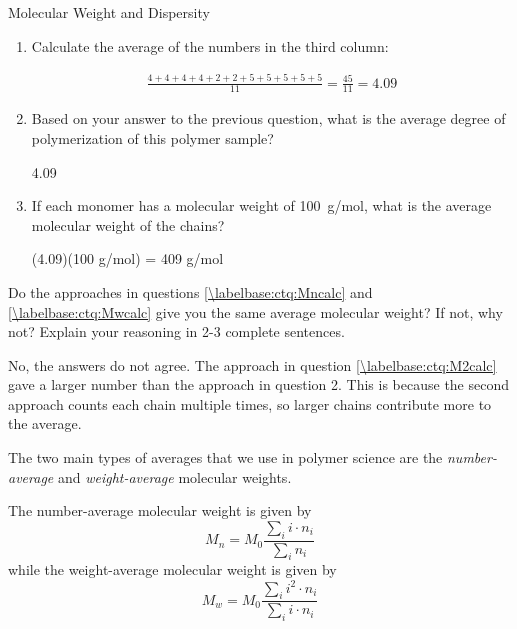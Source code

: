 \begin{activity}{Molecular Weight and Dispersity}
\begin{ctqs}
\begin{enumerate}
			\item Calculate the average of the numbers in the third column:
			
				\begin{solution}[1.5in]
				
					\begin{align*}
						\frac{4+4+4+4+2+2+5+5+5+5+5}{11} = \frac{45}{11} = 4.09
					\end{align*}
				
				\end{solution}
			
			\item Based on your answer to the previous question, what is the average degree of polymerization of this polymer sample?
			
				\begin{solution}[0.75in]
					4.09
				\end{solution}
				
			\item If each monomer has a molecular weight of 100~g/mol, what is the average molecular weight of the chains?
			
				\begin{solution}[0.75in]
					(4.09)(100 g/mol) = 409 g/mol
				\end{solution}
				
		\end{enumerate}
		
	\question Do the approaches in questions \ref{\labelbase:ctq:Mncalc} and \ref{\labelbase:ctq:Mwcalc} give you the same average molecular weight?  If not, why not?  Explain your reasoning in 2-3 complete sentences.
	
		\begin{solution}[3in]
			No, the answers do not agree.  The approach in question \ref{\labelbase:ctq:M2calc} gave a larger number than the approach in question 2. %
			This is because the second approach counts each chain multiple times, so larger chains contribute more to the average.
		\end{solution}
		
\end{ctqs}

\begin{infobox}
	
	The two main types of averages that we use in polymer science are the \emph{number-average} and \emph{weight-average} molecular weights.
	
	The number-average molecular weight is given by
	\begin{equation*}
		M_n = M_0 \frac{\sum_i i \cdot n_i}{\sum_i n_i}
	\end{equation*}
	while the weight-average molecular weight is given by
	\begin{equation*}
		M_w = M_0 \frac{\sum_i i^2 \cdot n_i}{\sum_i i\cdot n_i}
	\end{equation*}
	

\end{infobox}
\end{activity}

